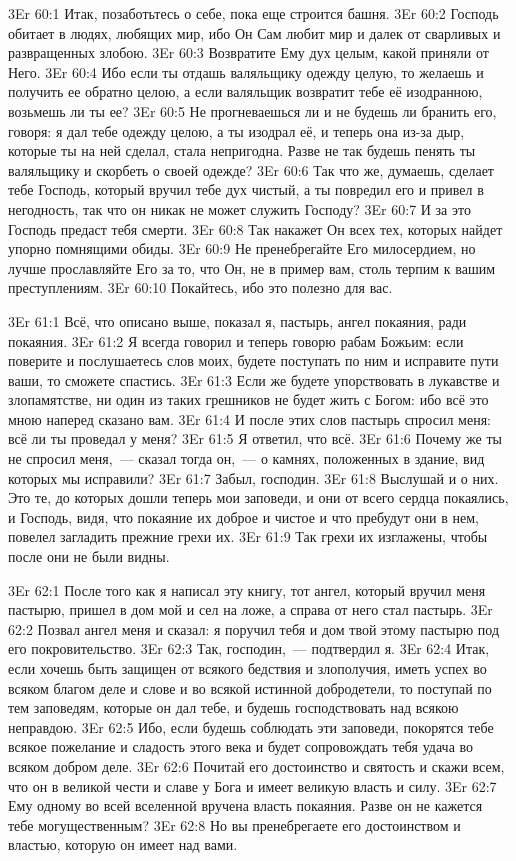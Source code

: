 \vs 3Er 60:1
Итак, позаботьтесь о себе,
пока еще строится башня.
\vs 3Er 60:2
Господь обитает в людях,
любящих мир, ибо Он Сам любит мир и далек от сварливых и развращенных злобою.
\vs 3Er 60:3
Возвратите Ему дух целым,
какой приняли от Него.
\vs 3Er 60:4
Ибо если ты отдашь
валяльщику одежду целую, то желаешь и получить ее обратно целою, а если
валяльщик возвратит тебе её изодранною, возьмешь ли ты ее?
\vs 3Er 60:5
Не прогневаешься ли и не
будешь ли бранить его, говоря: я дал тебе одежду целою, а ты изодрал её, и
теперь она из-за дыр, которые ты на ней сделал, стала непригодна. Разве не так
будешь пенять ты валяльщику и скорбеть о своей одежде?
\vs 3Er 60:6
Так что же, думаешь,
сделает тебе Господь, который вручил тебе дух чистый, а ты повредил его и
привел в негодность, так что он никак не может служить Господу?
\vs 3Er 60:7
И за это Господь предаст
тебя смерти.
\vs 3Er 60:8
Так накажет Он всех тех,
которых найдет упорно помнящими обиды.
\vs 3Er 60:9
Не пренебрегайте Его
милосердием, но лучше прославляйте Его за то, что Он, не в пример вам, столь
терпим к вашим преступлениям.
\vs 3Er 60:10
Покайтесь, ибо это
полезно для вас.

\vs 3Er 61:1
Всё, что описано выше,
показал я, пастырь, ангел покаяния, ради покаяния.
\vs 3Er 61:2
Я всегда говорил и теперь
говорю рабам Божьим: если поверите и послушаетесь слов моих, будете поступать
по ним и исправите пути ваши, то сможете спастись.
\vs 3Er 61:3
Если же будете
упорствовать в лукавстве и злопамятстве, ни один из таких грешников не будет
жить с Богом: ибо всё это мною наперед сказано вам.
\vs 3Er 61:4
И после этих слов пастырь
спросил меня: всё ли ты проведал у меня?
\vs 3Er 61:5
Я ответил, что всё.
\vs 3Er 61:6
Почему же ты не спросил
меня,~--- сказал тогда он,~--- о камнях, положенных в здание, вид которых мы
исправили?
\vs 3Er 61:7
Забыл, господин.
\vs 3Er 61:8
Выслушай и о них. Это те,
до которых дошли теперь мои заповеди, и они от всего сердца покаялись, и
Господь, видя, что покаяние их доброе и чистое и что пребудут они в нем,
повелел загладить прежние грехи их.
\vs 3Er 61:9
Так грехи их изглажены,
чтобы после они не были видны.

\vs 3Er 62:1
После того как я написал эту книгу, тот ангел, который
вручил меня пастырю, пришел в дом мой и сел на ложе, а справа от него стал
пастырь.
\vs 3Er 62:2
Позвал ангел меня и сказал: я поручил тебя и дом твой этому пастырю под его
покровительство.
\vs 3Er 62:3
Так, господин,~--- подтвердил я.
\vs 3Er 62:4
Итак, если хочешь быть
защищен от всякого бедствия и злополучия, иметь успех во всяком благом деле и
слове и во всякой истинной добродетели, то поступай по тем заповедям, которые
он дал тебе, и будешь господствовать над всякою неправдою.
\vs 3Er 62:5
Ибо, если будешь соблюдать
эти заповеди, покорятся тебе всякое пожелание и сладость этого века и будет
сопровождать тебя удача во всяком добром деле.
\vs 3Er 62:6
Почитай его достоинство и
святость и скажи всем, что он в великой чести и славе у Бога и имеет великую
власть и силу.
\vs 3Er 62:7
Ему одному во всей
вселенной вручена власть покаяния. Разве он не кажется тебе могущественным?
\vs 3Er 62:8
Но вы пренебрегаете его
достоинством и властью, которую он имеет над вами.

